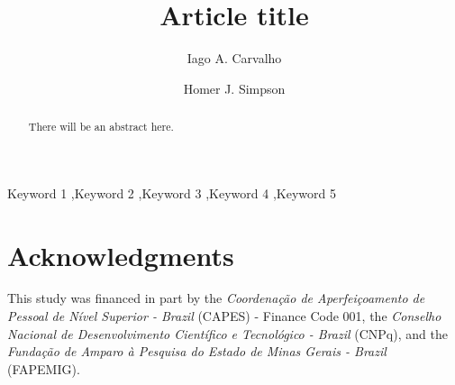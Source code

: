 \documentclass[preprint,review,12pt]{elsarticle}
\begin{document}
\begin{frontmatter}


\title{Article title}


\author[unifal]{Iago A. Carvalho}

\author[label2]{Homer J. Simpson}

\address[unifal]{Department of Computer Science, Universidade Federal de Alfenas}


\address[label2]{Twenty Century Fox, USA}

\begin{abstract}
There will be an abstract here.
\end{abstract}

\begin{keyword}
Keyword 1 \sep Keyword 2 \sep Keyword 3 \sep Keyword 4 \sep Keyword 5
\end{keyword}

\end{frontmatter}





\section*{Acknowledgments}
This study was financed in part by the \emph{Coordenação de Aperfeiçoamento de Pessoal de Nível Superior - Brazil} (CAPES) - Finance Code 001, the \emph{Conselho Nacional de Desenvolvimento Científico e Tecnológico - Brazil} (CNPq), and the \emph{Fundação de Amparo à Pesquisa do Estado de Minas Gerais - Brazil} (FAPEMIG).



% 



\end{document}

